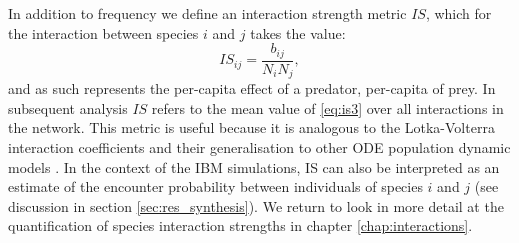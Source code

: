 In addition to frequency we define an interaction strength metric $IS$, which for the interaction between species $i$ and $j$ takes the value:
\begin{equation}
IS_{ij} = \frac{b_{ij}}{N_iN_j},
\label{eq:is3}
\end{equation}
%
and as such represents the per-capita effect of a predator, per-capita of prey. In subsequent analysis $IS$ refers to the mean value of \eqref{eq:is3} over all interactions in the network. This metric is useful because it is analogous to the Lotka-Volterra interaction coefficients and their generalisation to other ODE population dynamic models \cite{berlow2004interaction}. In the context of the IBM simulations, IS can also be interpreted as an estimate of the encounter probability between individuals of species $i$ and $j$ (see discussion in section \ref{sec:res_synthesis}). We return to look in more detail at the quantification of species interaction strengths in chapter \ref{chap:interactions}.

